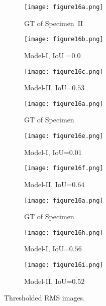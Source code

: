 \begin{sloppypar}
	\begin{figure} [!ht]
		\centering
		\begin{subfigure}[b]{0.32\textwidth}
			\centering
			\texttt{[image: figure16a.png]}
			\caption{GT of Specimen~II}
			\label{fig:gt_specimen_2}
		\end{subfigure}
		\hfill
		\begin{subfigure}[b]{.32\textwidth}
			\centering
			\texttt{[image: figure16b.png]}
			\caption{Model-I, IoU =$0.0$}
			\label{fig:RMS_threshold_L3_S2_B_saeed}
		\end{subfigure}
		\hfill
		\begin{subfigure}[b]{.32\textwidth}
			\centering
			\texttt{[image: figure16c.png]}
			\caption{Model-II, IoU=$0.53$} 
			\label{fig:RMS_threshold_L3_S2_B_ijjeh}
		\end{subfigure}
		\hfill
		\begin{subfigure}[b]{0.32\textwidth}
			\centering
			\texttt{[image: figure16a.png]}
			\caption{GT of Specimen~}
			\label{fig:gt_specimen_3}
		\end{subfigure}
		\hfill
		\begin{subfigure}[b]{.32\textwidth}
			\centering
			\texttt{[image: figure16e.png]}
			\caption{Model-I, IoU=$0.01$}
			\label{fig:RMS_threshold_L3_S3_B_saeed}
		\end{subfigure}
		\hfill
		\begin{subfigure}[b]{.32\textwidth}
			\centering
			\texttt{[image: figure16f.png]}
			\caption{Model-II, IoU=$0.64$} 
			\label{fig:RMS_threshold_L3_S3_B_ijjeh}
		\end{subfigure}
		\hfill
		\begin{subfigure}[b]{0.32\textwidth}
			\centering
			\texttt{[image: figure16a.png]}
			\caption{GT of Specimen~}
			\label{fig:gt_specimen_4}
		\end{subfigure}
		\hfill
		\begin{subfigure}[b]{.32\textwidth}
			\centering
			\texttt{[image: figure16h.png]}
			\caption{Model-I, IoU=$0.56$}
			\label{fig:RMS_threshold_L3_S4_B_saeed}
		\end{subfigure}
		\hfill
		\begin{subfigure}[b]{.32\textwidth}
			\centering
			\texttt{[image: figure16i.png]}
			\caption{Model-II, IoU=$0.52$} 
			\label{fig:RMS_threshold_L3_S4_B_ijjeh}
		\end{subfigure}
		\caption{Thresholded RMS images.}
		\label{fig:RMS_threshold_L3_S4_B__images}
	\end{figure} 
	

\end{sloppypar}

